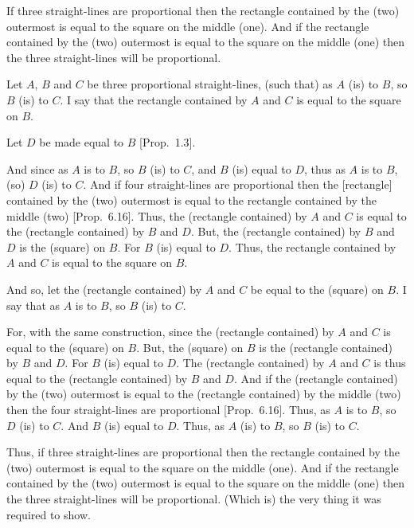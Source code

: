 If three straight-lines are proportional then
the rectangle contained by the (two) outermost is equal to the square
on the middle (one). And if the rectangle contained by the (two) outermost
is equal to the square on the middle (one) then the three straight-lines
will be proportional.

\epsfysize=0.9in
\centerline{}

Let $A$, $B$ and $C$ be three proportional straight-lines, (such that) as $A$ (is) to
$B$, so $B$ (is) to $C$. I say that the rectangle contained by $A$ and $C$ is
equal to the square on $B$.

Let $D$ be made equal to $B$  [Prop.~1.3].

And since as $A$ is to $B$, so $B$ (is) to $C$, and $B$ (is) equal to $D$, thus
as $A$ is to $B$, (so) $D$ (is) to $C$. And if four straight-lines are proportional
then the [rectangle] contained by the (two) outermost is equal
to the rectangle contained by the middle (two) [Prop.~6.16]. Thus, the (rectangle contained)
by $A$ and $C$ is equal to the (rectangle contained) by $B$ and $D$. 
But, the (rectangle contained) by $B$ and $D$ is the (square) on $B$. For
$B$ (is) equal to $D$. Thus, the rectangle contained by $A$ and $C$ is equal
to the square on $B$.

And so, let the (rectangle contained) by $A$ and $C$ be equal to
the (square) on $B$. I say that as $A$ is to $B$, so $B$ (is) to $C$.

For, with the same construction, since the (rectangle contained)
by $A$ and $C$ is equal to the (square) on $B$. But, the (square) on $B$
is the (rectangle contained) by $B$ and $D$. For $B$ (is) equal to $D$.
The (rectangle contained) by $A$ and $C$ is thus equal to the (rectangle
contained) by $B$ and $D$. And if the (rectangle contained) by the (two)
outermost is equal to the (rectangle contained) by the middle (two) then
the four straight-lines are proportional [Prop.~6.16]. 
Thus, as $A$ is to $B$, so $D$ (is) to $C$.
And $B$ (is) equal to $D$. Thus, as $A$ (is) to $B$, so $B$ (is) to $C$.

Thus,  if three straight-lines are proportional then
the rectangle contained by the (two) outermost is equal to the square
on the middle (one). And if the rectangle contained by the (two) outermost
is equal to the square on the middle (one) then the three straight-lines
will be proportional. (Which is) the very thing it was required to show.


